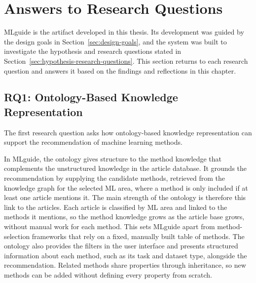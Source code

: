 \section{Answers to Research Questions}
\label{sec:answers-to-research-questions}

MLguide is the artifact developed in this thesis. Its 
development was guided by the design goals in 
Section~\ref{sec:design-goals}, and the system was built to 
investigate the hypothesis and research questions stated in 
Section~\ref{sec:hypothesis-research-questions}. This section 
returns to each research question and answers it based on the 
findings and reflections in this chapter.

\subsection{RQ1: Ontology-Based Knowledge Representation}

The first research question asks how ontology-based knowledge 
representation can support the recommendation of machine 
learning methods.

In MLguide, the ontology gives structure to the method knowledge that 
complements the unstructured knowledge in the article database. It 
grounds the recommendation by supplying the candidate methods, 
retrieved from the knowledge graph for the selected ML area, where a 
method is only included if at least one article mentions it. The main 
strength of the ontology is therefore this link to the articles. Each 
article is classified by ML area and linked to the methods it 
mentions, so the method knowledge grows as the article base grows, 
without manual work for each method. This sets MLguide apart from 
method-selection frameworks that rely on a fixed, manually built table 
of methods. The ontology also provides the filters in the user 
interface and presents structured information about each method, such 
as its task and dataset type, alongside the recommendation. Related 
methods share properties through inheritance, so new methods can be 
added without defining every property from scratch.

